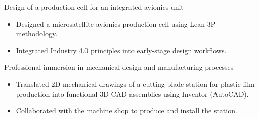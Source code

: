 \documentclass[10pt,a4paper,ragged2e,withhyper]{altacv}
\begin{document}
\divider

\textcolor{myRed}{Design of a production cell for an integrated avionics unit}
\begin{itemize}[leftmargin=1.5em]
  \item Designed a microsatellite avionics production cell using Lean 3P methodology.
  \item Integrated Industry 4.0 principles into early-stage design workflows.
\end{itemize}

\divider

\textcolor{myRed}{Professional immersion in mechanical design and manufacturing processes}
\begin{itemize}[leftmargin=1.5em]
  \item Translated 2D mechanical drawings of a cutting blade station for plastic film production into functional 3D CAD assemblies using Inventor (AutoCAD).
  \item Collaborated with the machine shop to produce and install the station.
\end{itemize}

\medskip








\end{document}
